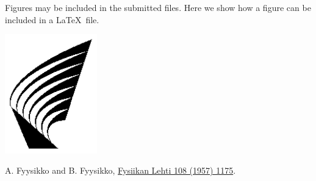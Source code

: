 \documentclass[12pt]{article}
\begin{document}

\begin{minipage}{9cm}
Figures may be included in the submitted files. Here we show how a
figure can be included in a \LaTeX\ file.
\end{minipage}
\hfill
\begin{minipage}{5cm}
\includegraphics[width=4cm]{logo.eps}
\end{minipage}


\begin{thebibliography}{9}

A. Fyysikko and B. Fyysikko,
\href{http://link.aps.org/abstract/PR/v108/p1175}{Fysiikan Lehti 108
(1957) 1175}.
\end{thebibliography}
\end{document}
